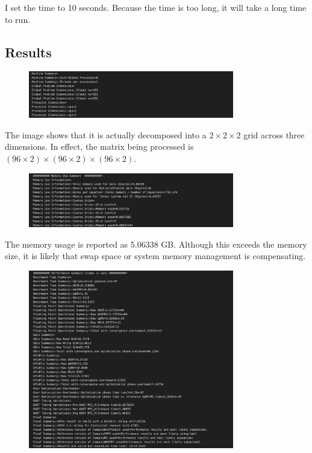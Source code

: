 \documentclass{article}
\begin{document}
I set the time to 10 seconds. Because the time is too long, it will take a long time to run.

\subsection*{Results}

\begin{figure}[htbp]
    \centering
    \includegraphics[width=0.8\textwidth]{./img/HPCG_Machine.png}
\end{figure}

The image shows that it is actually decomposed into a $2 \times 2 \times 2$ grid across three dimensions. In effect, the matrix being processed is $(96 \times 2) \times (96 \times 2) \times (96 \times 2)$.

\begin{figure}[htbp]
    \centering
    \includegraphics[width=0.8\textwidth]{./img/HPCG_Memory.png}
\end{figure}

The memory usage is reported as 5.06338 GB. Although this exceeds the memory size, it is likely that swap space or system memory management is compensating.

\clearpage

\begin{figure}[htbp]
    \centering
    \includegraphics[width=0.8\textwidth]{./img/HPCG_Performance.png}
\end{figure}
\end{document}
